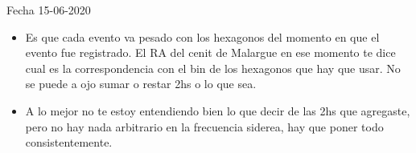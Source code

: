 









Fecha  15-06-2020

\begin{itemize}
	\item Es que cada evento va pesado con los hexagonos del momento en que el evento fue registrado. El RA del cenit de Malargue en ese momento te dice cual es la correspondencia con el bin de los hexagonos que hay que usar. No se puede a ojo sumar o restar 2hs o lo que sea.
	\item A lo mejor no te estoy entendiendo bien lo que decir de las 2hs que agregaste, pero no hay nada arbitrario en la frecuencia siderea, hay que poner todo consistentemente.
\end{itemize}